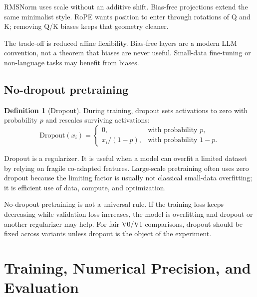\documentclass[11pt,a4paper]{article}
\theoremstyle{definition}
\newtheorem{definition}{Definition}[section]
\theoremstyle{plain}
\begin{document}
\begin{connectionbox}
RMSNorm uses scale without an additive shift. Bias-free projections extend the same minimalist style. RoPE wants position to enter through rotations of Q and K; removing Q/K biases keeps that geometry cleaner.
\end{connectionbox}

The trade-off is reduced affine flexibility. Bias-free layers are a modern LLM convention, not a theorem that biases are never useful. Small-data fine-tuning or non-language tasks may benefit from biases.

\subsection{No-dropout pretraining}

\begin{definition}[Dropout]
During training, dropout sets activations to zero with probability $p$ and rescales surviving activations:
\begin{equation}
    \mathrm{Dropout}(x_i)=\begin{cases}
        0, & \text{with probability }p,\\
        x_i/(1-p), & \text{with probability }1-p.
    \end{cases}
\end{equation}
\end{definition}

Dropout is a regularizer. It is useful when a model can overfit a limited dataset by relying on fragile co-adapted features. Large-scale pretraining often uses zero dropout because the limiting factor is usually not classical small-data overfitting; it is efficient use of data, compute, and optimization.

\begin{tradeoffbox}
No-dropout pretraining is not a universal rule. If the training loss keeps decreasing while validation loss increases, the model is overfitting and dropout or another regularizer may help. For fair V0/V1 comparisons, dropout should be fixed across variants unless dropout is the object of the experiment.
\end{tradeoffbox}

\section{Training, Numerical Precision, and Evaluation}
\label{sec:training-eval}
\end{document}
